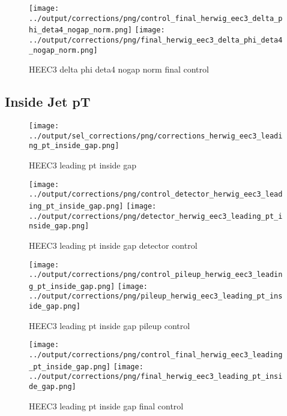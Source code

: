 \documentclass[11pt]{book}
\begin{document}
\begin{figure}[ht]
\centering
\texttt{[image: ../output/corrections/png/control\_final\_herwig\_eec3\_delta\_phi\_deta4\_nogap\_norm.png]}
\texttt{[image: ../output/corrections/png/final\_herwig\_eec3\_delta\_phi\_deta4\_nogap\_norm.png]}
\caption{HEEC3 delta phi deta4 nogap norm final control}
\label{fig:HEEC3_delta_phi_deta4_nogap_norm_final_control}
\end{figure}



\clearpage
\subsection{Inside Jet pT}
\begin{figure}[ht]
\centering
\texttt{[image: ../output/sel\_corrections/png/corrections\_herwig\_eec3\_leading\_pt\_inside\_gap.png]}
\caption{HEEC3 leading pt inside gap}
\label{fig:HEEC3_leading_pt_inside_gap}
\end{figure}

\begin{figure}[ht]
\centering
\texttt{[image: ../output/corrections/png/control\_detector\_herwig\_eec3\_leading\_pt\_inside\_gap.png]}
\texttt{[image: ../output/corrections/png/detector\_herwig\_eec3\_leading\_pt\_inside\_gap.png]}
\caption{HEEC3 leading pt inside gap detector control}
\label{fig:HEEC3_leading_pt_inside_gap_detector_control}
\end{figure}

\begin{figure}[ht]
\centering
\texttt{[image: ../output/corrections/png/control\_pileup\_herwig\_eec3\_leading\_pt\_inside\_gap.png]}
\texttt{[image: ../output/corrections/png/pileup\_herwig\_eec3\_leading\_pt\_inside\_gap.png]}
\caption{HEEC3 leading pt inside gap pileup control}
\label{fig:HEEC3_leading_pt_inside_gap_pileup_control}
\end{figure}


\begin{figure}[ht]
\centering
\texttt{[image: ../output/corrections/png/control\_final\_herwig\_eec3\_leading\_pt\_inside\_gap.png]}
\texttt{[image: ../output/corrections/png/final\_herwig\_eec3\_leading\_pt\_inside\_gap.png]}
\caption{HEEC3 leading pt inside gap final control}
\label{fig:HEEC3_leading_pt_inside_gap_final_control}
\end{figure}
\end{document}

